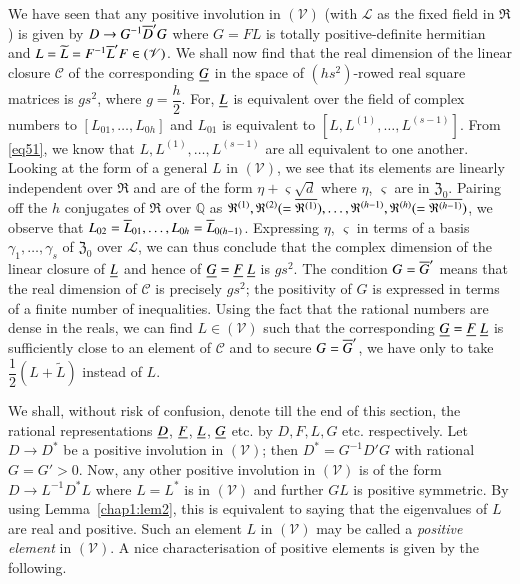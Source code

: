 We have seen that any positive involution in $(\mathscr{V})$ (with
$\mathscr{L}$ as the fixed field in $\mathfrak{R}$) is given by $D
\rightarrow G^{-1} \overline{D}' G$ where $G=FL$ is totally
positive-definite hermitian and $L = \widetilde{L}=F^{-1} \overline{L}' F
\in (\mathscr{V})$. We shall now find that the real dimension of the
linear closure $\mathscr{C}$ of the corresponding $\underline{G}$ in the
space of $(hs^2)$-rowed real square matrices is $gs^2$, where
$g=\dfrac{h}{2}$. For, $\underline{L}$ is equivalent over the field of
complex numbers to $[L_{01},\ldots, L_{0h}]$ and $L_{01}$ is equivalent
to $[L, L^{(1)},\ldots, L^{(s-1)}]$. From \eqref{eq51}, we know that $L,
L^{(1)},\ldots, L^{(s-1)}$ are all equivalent to one
another. \pageoriginale Looking
at the form of a general $L$ in $(\mathscr{V})$, we see that its
elements are linearly independent over $\mathfrak{R}$ and are of the
form $\eta + \varsigma\sqrt{d}$ where $\eta$, $\varsigma$ are in
$\mathfrak{Z}_0$. Pairing off the $h$ conjugates of $\mathfrak{R}$
over $\mathbb{Q}$ as $\mathfrak{R}^{(1)}, \mathfrak{R}^{(2)} (=
\overline{\mathfrak{R}^{(1)}}),\ldots, \mathfrak{R}^{(h-1)},
\mathfrak{R}^{(h)} (=\overline{\mathfrak{R}^{(h-1)}})$, we observe that
$L_{02} = \overline{L}_{01},\ldots, L_{0h} = \overline{L}_{0(h-1)}$. Expressing
$\eta$, $\varsigma$ in terms of a basis $\gamma_1,\ldots, \gamma_s$ of
$\mathfrak{Z}_0$ over $\mathscr{L}$, we can thus conclude that the
complex dimension of the linear closure of $\underline{L}$ and hence of
$\underline{G} = \underline{F}\;\underline{L}$ is $gs^2$. The condition $G=\overline{G}'$ means
that the real dimension of $\mathscr{C}$ is precisely $gs^2$; the
positivity of $G$ is expressed in terms of a finite number of
inequalities. Using the fact that the rational numbers are dense in
the reals, we can find $L \in (\mathscr{V})$ such that the
corresponding $\underline{G} = \underline{F} \; \underline{L}$ is sufficiently close to an
element of $\mathscr{C}$ and to secure $G=\overline{G}'$, we have only to
take $\dfrac{1}{2}(L+\widetilde{L})$ instead of $L$.

We shall, without risk of confusion, denote till the end of this
section, the rational representations $\underline{D}$, $\underline{F}$, $\underline{L}$,
$\underline{G}$ etc. by $D, F, L, G$ etc. respectively. Let $D\rightarrow
D^{\ast}$ be a positive involution in $(\mathscr{V})$; then
$D^{\ast}=G^{-1} D'G$ with rational $G=G'>0$. Now, any other positive
involution in $(\mathscr{V})$ is of the form $D \rightarrow
L^{-1}D^{\ast}L$ where $L=L^{\ast}$ is in $(\mathscr{V})$ and further
$GL$ is positive symmetric. By using Lemma~\ref{chap1:lem2}, this is equivalent to
saying that the eigenvalues of $L$ are real and positive. Such an
element $L$ in $(\mathscr{V})$ may be called a {\em positive element}
in $(\mathscr{V})$. A nice characterisation of positive elements is
given by the following.

